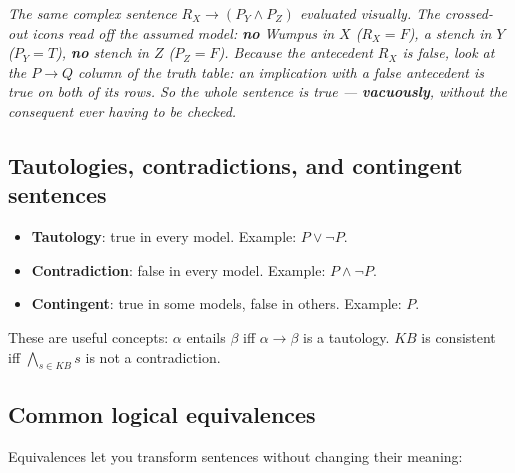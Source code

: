 \documentclass[11pt, a4paper]{article}
\begin{document}
\begin{center}

\footnotesize\textit{The same complex sentence $R_X \rightarrow (P_Y \land P_Z)$ evaluated visually. The crossed-out icons read off the assumed model: \textbf{no} Wumpus in $X$ ($R_X = F$), a stench in $Y$ ($P_Y = T$), \textbf{no} stench in $Z$ ($P_Z = F$). Because the antecedent $R_X$ is false, look at the $P \rightarrow Q$ column of the truth table: an implication with a false antecedent is true on \emph{both} of its rows. So the whole sentence is true — \textbf{vacuously}, without the consequent ever having to be checked.}
\end{center}

\subsection{Tautologies, contradictions, and contingent sentences}

\begin{defbox}
\begin{itemize}[itemsep=0pt, topsep=0pt]
  \item \textbf{Tautology}: true in every model. Example: $P \lor \neg P$.
  \item \textbf{Contradiction}: false in every model. Example: $P \land \neg P$.
  \item \textbf{Contingent}: true in some models, false in others. Example: $P$.
\end{itemize}
\end{defbox}

These are useful concepts: $\alpha$ entails $\beta$ iff $\alpha \rightarrow \beta$ is a tautology. $KB$ is consistent iff $\bigwedge_{s \in KB} s$ is not a contradiction.

\subsection{Common logical equivalences}

Equivalences let you transform sentences without changing their meaning:
\end{document}
